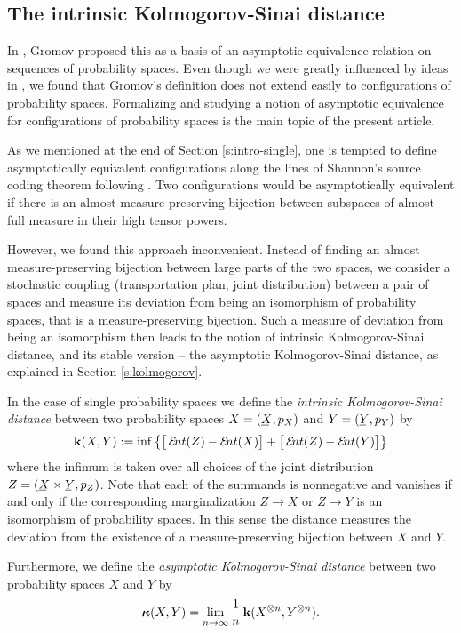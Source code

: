 \subsection{The intrinsic Kolmogorov-Sinai distance}

\skippar In \cite{Gromov-Search-2012}, Gromov proposed this as a basis of an asymptotic equivalence relation on 
sequences of probability spaces. 
Even though we were greatly influenced by ideas in \cite{Gromov-Search-2012}, we found that Gromov's definition does not extend easily to configurations of probability spaces. 
Formalizing and studying a notion of asymptotic equivalence for configurations of probability spaces is the main topic of the present article.

As we mentioned at the end of Section \ref{s:intro-single}, one is
tempted to define asymptotically equivalent configurations along the
lines of Shannon's source coding theorem following
\cite{Gromov-Search-2012}.  Two configurations would be asymptotically
equivalent if there is an almost measure-preserving bijection between
subspaces of almost full measure in their high tensor powers.

However, we found this approach inconvenient.  Instead of finding an
almost measure-preserving bijection between large parts of the two spaces,
 we consider a stochastic coupling
(transportation plan, joint distribution) between a pair of spaces and
measure its deviation from being an isomorphism of probability spaces,
that is a measure-preserving bijection.  Such a measure of deviation
from being an isomorphism then leads to the notion of intrinsic
Kolmogorov-Sinai distance, and its stable version -- the asymptotic
Kolmogorov-Sinai distance, as explained in Section \ref{s:kolmogorov}.

In the case of single probability spaces we define the \emph{intrinsic
  Kolmogorov-Sinai distance} between two probability spaces $X=(\un
X,p_{X})$ and $Y=(\un Y,p_{Y})$ by
\[
\ikd(X, Y) := \inf \set{\big[\ent(Z)-\ent(X)\big] +
\big[\ent(Z)-\ent(Y)\big]}
\]
where the infimum is taken over all choices of the joint distribution
$Z=(\un X\times\un Y,p_{Z})$. Note that each of the summands is
nonnegative and vanishes if and only if the corresponding
marginalization $Z\to X$ or $Z\to Y$ is an isomorphism of probability
spaces.  In this sense the distance measures the deviation from the
existence of a measure-preserving bijection between $X$ and $Y$.

Furthermore, we define the \emph{asymptotic Kolmogorov-Sinai distance}
between two probability spaces $X$ and $Y$ by
\[
\operatorname{{\bm\kappa}}(X, Y) = \lim_{n \stackrel{}{\rightarrow} \infty} \frac{1}{n} \operatorname{\mathbf{k}} (X^{\otimes n }, Y^{\otimes n}).
\]

